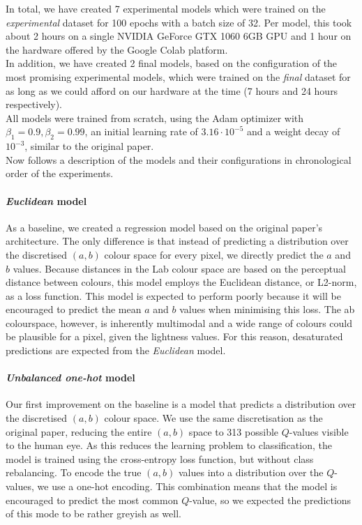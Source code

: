 \documentclass{article}
\begin{document}
In total, we have created 7 experimental models which were trained on the \textit{experimental} dataset
for 100 epochs with a batch size of 32. Per model,
this took about 2 hours on a single NVIDIA GeForce GTX 1060 6GB GPU and 1 hour on
the hardware offered by the Google Colab platform.\\
In addition, we have created 2 final models, based on the configuration of the most
promising experimental models, which were trained on the \textit{final} dataset for
as long as we could afford on our hardware at the time (7 hours and 24 hours respectively).\\
All models were trained from scratch, using the Adam optimizer with $\beta_1 = 0.9, \beta_2 = 0.99$,
an initial learning rate of $3.16 \cdot 10^{-5}$ and a weight decay of $10^{-3}$, similar to
the original paper.\\
Now follows a description of the models and their configurations in chronological order of the experiments.

\paragraph{\textit{Euclidean} model}
As a baseline, we created a regression model based on the original paper's architecture.
The only difference is that instead of predicting a distribution over the discretised $(a, b)$ colour space for every pixel,
we directly predict the $a$ and $b$ values. Because distances in the Lab colour space are
based on the perceptual distance between colours, this model employs the Euclidean distance, or
L2-norm, as a loss function. This model is expected to perform poorly because it will be encouraged to
predict the mean $a$ and $b$ values when
minimising this loss. The ab colourspace, however, is inherently multimodal and a wide range
of colours could be plausible for a pixel, given the lightness values.
For this reason, desaturated predictions are expected from the \textit{Euclidean} model.
\paragraph{\textit{Unbalanced one-hot} model}
Our first improvement on the baseline is a model that predicts a distribution over the discretised
$(a, b)$ colour space. We use the same discretisation as the original paper,
reducing the entire $(a, b)$ space to 313 possible $Q$-values visible to the human eye.
As this reduces the learning problem to classification, the model is trained using the cross-entropy loss function,
but without class rebalancing.
To encode the true $(a, b)$ values into a distribution over the $Q$-values, we use a one-hot encoding.
This combination means that the model is encouraged to predict the most common $Q$-value,
so we expected the predictions of this mode to be rather greyish as well.
\end{document}
